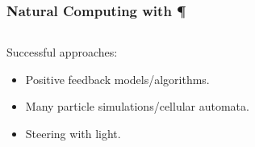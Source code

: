 \documentclass[	hyperref={pdfpagelabels=false}, xcolor=dvipsnames,
		11pt]{beamer}
\begin{document}
\begin{frame}
    \frametitle{Natural Computing with \P} 

	\begin{columns}
	\begin{column}{4.6cm}

	\begin{overprint}

		\begin{block}{Successful approaches:}
		  \begin{itemize}
		   \item<1> Positive feedback models/algorithms.
		   \item<2> Many particle simulations/cellular automata. 
		   \item<3> Steering with light.
		  \end{itemize}
		\end{block}

	\end{overprint}

	\end{column}

	\begin{column}{5cm}
	\begin{overprint}

	\testbox{
	\begin{minipage}[t]{5 cm}


\end{minipage}}
\end{overprint}
\end{column}
\end{columns}
\end{frame}
\end{document}
